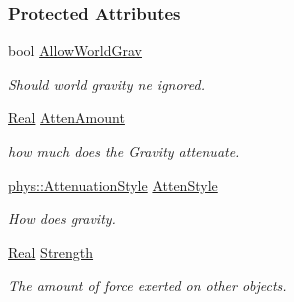 \subsubsection*{Protected Attributes}
\begin{DoxyCompactItemize}
\item 
\hypertarget{classphys_1_1GravityWell_a8b7106e7670a7bc074c245269d211ba0}{
bool \hyperlink{classphys_1_1GravityWell_a8b7106e7670a7bc074c245269d211ba0}{AllowWorldGrav}}
\label{classphys_1_1GravityWell_a8b7106e7670a7bc074c245269d211ba0}

\begin{DoxyCompactList}\small\item\em Should world gravity ne ignored. \item\end{DoxyCompactList}\item 
\hypertarget{classphys_1_1GravityWell_ad9fd8f2f2dea6a53241ef90852e84503}{
\hyperlink{namespacephys_af7eb897198d265b8e868f45240230d5f}{Real} \hyperlink{classphys_1_1GravityWell_ad9fd8f2f2dea6a53241ef90852e84503}{AttenAmount}}
\label{classphys_1_1GravityWell_ad9fd8f2f2dea6a53241ef90852e84503}

\begin{DoxyCompactList}\small\item\em how much does the Gravity attenuate. \item\end{DoxyCompactList}\item 
\hypertarget{classphys_1_1GravityWell_a89bebdb2ea22c24cb4c30eb31f019166}{
\hyperlink{namespacephys_ad4ce7ee5c1cc164f2ea3d5f28211739f}{phys::AttenuationStyle} \hyperlink{classphys_1_1GravityWell_a89bebdb2ea22c24cb4c30eb31f019166}{AttenStyle}}
\label{classphys_1_1GravityWell_a89bebdb2ea22c24cb4c30eb31f019166}

\begin{DoxyCompactList}\small\item\em How does gravity. \item\end{DoxyCompactList}\item 
\hypertarget{classphys_1_1GravityWell_acc6e405d39cdc6017040902190e16652}{
\hyperlink{namespacephys_af7eb897198d265b8e868f45240230d5f}{Real} \hyperlink{classphys_1_1GravityWell_acc6e405d39cdc6017040902190e16652}{Strength}}
\label{classphys_1_1GravityWell_acc6e405d39cdc6017040902190e16652}

\begin{DoxyCompactList}\small\item\em The amount of force exerted on other objects. \item\end{DoxyCompactList}\end{DoxyCompactItemize}


